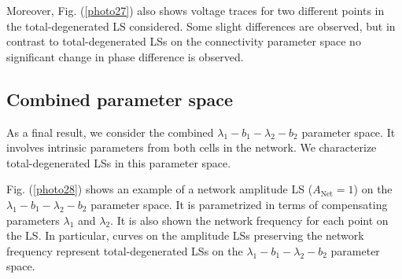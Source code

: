 Moreover, Fig. (\ref{photo27}) also shows voltage traces for two different points in the total-degenerated LS considered. Some slight differences are observed, but in contrast to total-degenerated LSs on the connectivity parameter space no significant change in phase difference is observed.

\subsection{Combined parameter space}
As a final result, we consider the combined $\lambda_{1}-b_{1}-\lambda_{2}-b_{2}$ parameter space. It involves intrinsic parameters from both cells in the network. We characterize total-degenerated LSs in this parameter space.

Fig. (\ref{photo28}) shows an example of a network amplitude LS ($A_{\text{Net}}=1$) on the $\lambda_{1}-b_{1}-\lambda_{2}-b_{2}$ parameter space. It is parametrized in terms of compensating parameters $\lambda_{1}$ and $\lambda_{2}$. It is also shown the network frequency for each point on the LS. In particular, curves on the amplitude LSs preserving the network frequency represent total-degenerated LSs on the $\lambda_{1}-b_{1}-\lambda_{2}-b_{2}$ parameter space.

